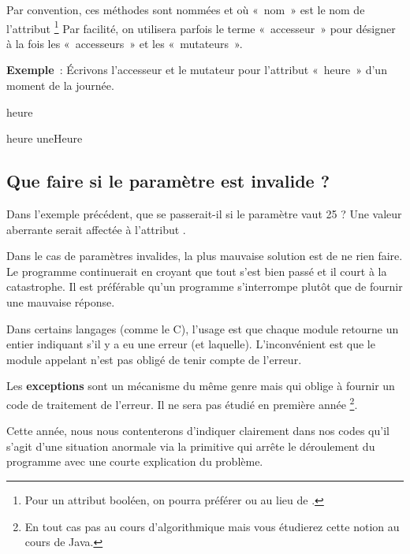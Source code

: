 	Par convention, 
	ces méthodes sont nommées  et 
	 où «~nom~» est le nom de l'attribut%
	\footnote{%
		Pour un attribut booléen, 
		on pourra préférer  ou  
		au lieu de . 
	}
	Par facilité, on utilisera parfois le terme «~accesseur~»
	pour désigner à la fois les «~accesseurs~» et les «~mutateurs~».

	\textbf{Exemple}~:
	Écrivons l'accesseur et le mutateur pour l'attribut 
	«~heure~» d'un moment de la journée.

	\begin{Pseudocode}
			\Return heure
		\EndMethod
	\end{Pseudocode}

	\begin{Pseudocode}
		\Method{setHeure}{uneHeure~: entier}{}
			\Stmt heure \Gets uneHeure
		\EndMethod
	\end{Pseudocode}

	\subsection{Que faire si le paramètre est invalide ?}
	
	Dans l'exemple précédent, 
	que se passerait-il si le paramètre  vaut 25 ? 
	Une valeur aberrante serait affectée à l'attribut .

	Dans le cas de paramètres invalides, 
	la plus mauvaise solution est de ne rien faire. 
	Le programme continuerait en croyant que tout s’est bien
	passé et il court à la catastrophe. 
	Il est préférable qu’un programme s'interrompe 
	plutôt que de fournir une mauvaise réponse. 

	Dans certains langages (comme le C), 
	l’usage est que chaque module retourne un entier indiquant 
	s'il y a eu une erreur (et laquelle). 
	L’inconvénient est que le module appelant n’est pas
	obligé de tenir compte de l’erreur.

	Les \textbf{exceptions} sont un mécanisme du même genre 
	mais qui oblige à fournir un code de traitement de l’erreur. 
	Il ne sera pas étudié en première année%
	\footnote{%
		En tout cas pas au cours d'algorithmique 
		mais vous étudierez cette notion au cours de Java.%
	}.

	Cette année, nous nous contenterons d'indiquer
	clairement dans nos codes qu'il s'agit d'une situation anormale 
	via la primitive  qui arrête le déroulement du
	programme avec une courte explication du problème.

